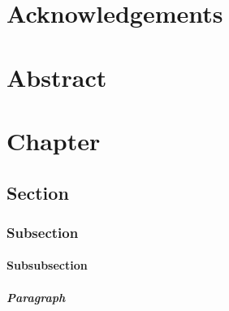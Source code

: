 \documentclass[english,counters by chapter]{uniud}
\begin{document}

\frontmatter

\maketitle

\chapter*{Acknowledgements}

\blindtext

\chapter*{Abstract}

\blindtext

\cleardoublepage

\tableofcontents*


\mainmatter

\chapter{Chapter}
\blindmathtrue

\blindtext

\section{Section}

\blindtext

\subsection{Subsection}

\blindtext

\subsubsection{Subsubsection}

\blindtext

\paragraph{Paragraph}
\end{document}
